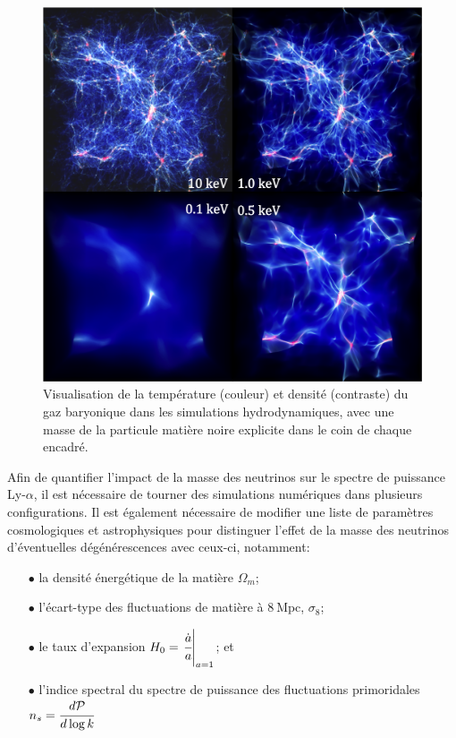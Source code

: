 \begin{figure}
\begin{center}
\includegraphics[width=0.85\columnwidth]{Figures/Visu/CWH.png}
\caption{Visualisation de la température (couleur) et densité (contraste) du gaz baryonique dans les simulations hydrodynamiques, avec une masse de la particule matière noire explicite dans le coin de chaque encadré.}
\label{fig:visu}
\end{center}
\end{figure}

Afin de quantifier l'impact de la masse des neutrinos sur le spectre de puissance Ly-$\alpha$, il est nécessaire de tourner des simulations numériques dans plusieurs configurations. Il est également nécessaire de modifier une liste de paramètres cosmologiques et astrophysiques pour distinguer l'effet de la masse des neutrinos d'éventuelles dégénérescences avec ceux-ci, notamment: \\
\begin{itemize}
\item[$\bullet$] la densité énergétique de la matière $\Omega_m$; \\
\item[$\bullet$] l'écart-type des fluctuations de matière à $8~\mathrm{Mpc}$, $\sigma_8$; \\
\item[$\bullet$] le taux d'expansion $H_0 = \left. \cfrac{\dot{a}}{a} \right\vert_{a=1}$; et \\
\item[$\bullet$] l'indice spectral du spectre de puissance des fluctuations primoridales $n_s = \cfrac{d \mathcal{P}}{d \log k}$ \\
\end{itemize}

